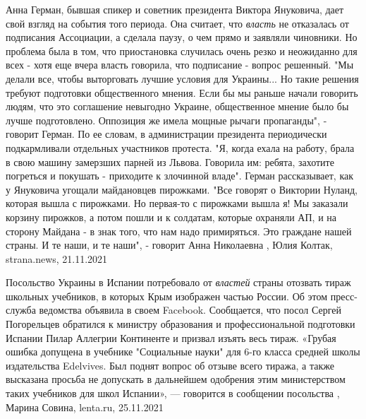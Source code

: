 Анна Герман, бывшая спикер и советник президента Виктора Януковича, дает свой
взгляд на события того периода.  Она считает, что \emph{власть} не отказалась
от подписания Ассоциации, а сделала паузу, о чем прямо и заявляли чиновники. Но
проблема была в том, что приостановка случилась очень резко и неожиданно для
всех - хотя еще вчера власть говорила, что подписание - вопрос решенный.  "Мы
делали все, чтобы выторговать лучшие условия для Украины... Но такие решения
требуют подготовки общественного мнения. Если бы  мы раньше начали говорить
людям, что это соглашение невыгодно Украине, общественное мнение было бы лучше
подготовлено. Оппозиция же имела мощные рычаги пропаганды", - говорит Герман.
По ее словам, в администрации президента периодически подкармливали отдельных
участников протеста. "Я, когда ехала на работу, брала в свою машину замерзших
парней из Львова. Говорила им: ребята, захотите погреться и покушать -
приходите к злочинной владе".  Герман рассказывает, как у Януковича угощали
майдановцев пирожками.  "Все говорят о Виктории Нуланд, которая вышла с
пирожками. Но первая-то с пирожками вышла я! Мы заказали корзину пирожков, а
потом пошли и к солдатам, которые охраняли АП, и на сторону Майдана - в знак
того, что нам надо примиряться. Это граждане нашей страны. И те наши, и те
наши", - говорит Анна Николаевна
, 
Юлия Колтак, strana.news, 21.11.2021

Посольство Украины в Испании потребовало от \emph{властей} страны отозвать тираж
школьных учебников, в которых Крым изображен частью России. Об этом
пресс-служба ведомства объявила в своем Facebook. Сообщается, что посол Сергей
Погорельцев обратился к министру образования и профессиональной подготовки
Испании Пилар Аллегрии Континенте и призвал изъять весь тираж. «Грубая ошибка
допущена в учебнике "Социальные науки" для 6-го класса средней школы
издательства Edelvives. Был поднят вопрос об отзыве всего тиража, а также
высказана просьба не допускать в дальнейшем одобрения этим министерством таких
учебников для школ Испании», — говорится в сообщении посольства
, 
Марина Совина, lenta.ru, 25.11.2021

